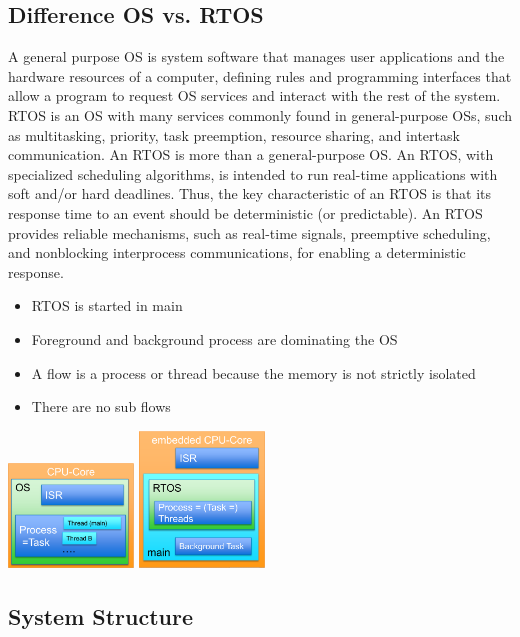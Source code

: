 \subsection{Difference OS vs. RTOS}
A general purpose OS is system software that manages user applications and the hardware resources of a computer, defining rules and programming interfaces that allow a program to request OS services and interact with the rest of the system.
RTOS is an OS with many services commonly found in general-purpose OSs, such as multitasking, priority, task preemption, resource sharing, and intertask communication.
An RTOS is more than a general-purpose OS. An RTOS, with specialized scheduling algorithms, is intended to run real-time applications with soft and/or hard deadlines.
Thus, the key characteristic of an RTOS is that its response time to an event should be deterministic (or predictable).
An RTOS provides reliable mechanisms, such as real-time signals, preemptive scheduling, and nonblocking interprocess communications, for enabling a deterministic response.
\begin{itemize}
    \item RTOS is started in main
    \item Foreground and background process are dominating the OS
    \item A flow is a process or thread because the memory is not strictly isolated
    \item There are no sub flows
\end{itemize}
\includegraphics[width=0.25\textwidth]{images/Concurrency/os_process_thread.png}
\includegraphics[width=0.25\textwidth]{images/Concurrency/rtos_process_thread.png}

\subsection{System Structure}

